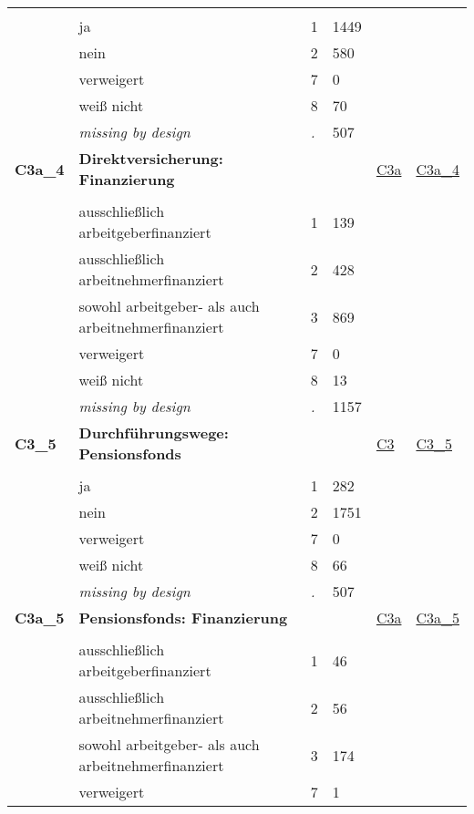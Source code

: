 \begin{longtable}{| L{2.45cm} | L{6cm} | C{1.5cm} | R{1cm} | C{2.25cm} | C{2.25cm} |}
   &  &  &  &  &  \\ 
   & ja & 1 & 1449 &  &  \\ 
   & nein & 2 & 580 &  &  \\ 
   & verweigert & 7 & 0 &  &  \\ 
   & weiß nicht & 8 & 70 &  &  \\ 
   & \textit{missing by design} & \textit{.} & 507 &  &  \\ 
   \midrule
\textbf{C3a\_4}\label{var:C3a:4} & \textbf{Direktversicherung: Finanzierung} &  &  & \hyperref[C3a]{C3a} & \hyperref[var:suf:C3a:4]{C3a\_4} \\ 
   &  &  &  &  &  \\ 
   & ausschließlich arbeitgeberfinanziert & 1 & 139 &  &  \\ 
   & ausschließlich arbeitnehmerfinanziert & 2 & 428 &  &  \\ 
   & sowohl arbeitgeber- als auch arbeitnehmerfinanziert & 3 & 869 &  &  \\ 
   & verweigert & 7 & 0 &  &  \\ 
   & weiß nicht & 8 & 13 &  &  \\ 
   & \textit{missing by design} & \textit{.} & 1157 &  &  \\ 
   \midrule
\textbf{C3\_5}\label{var:C3:5} & \textbf{Durchführungswege: Pensionsfonds} &  &  & \hyperref[C3]{C3} & \hyperref[var:suf:C3:5]{C3\_5} \\ 
   &  &  &  &  &  \\ 
   & ja & 1 & 282 &  &  \\ 
   & nein & 2 & 1751 &  &  \\ 
   & verweigert & 7 & 0 &  &  \\ 
   & weiß nicht & 8 & 66 &  &  \\ 
   & \textit{missing by design} & \textit{.} & 507 &  &  \\ 
   \midrule
\textbf{C3a\_5}\label{var:C3a:5} & \textbf{Pensionsfonds: Finanzierung} &  &  & \hyperref[C3a]{C3a} & \hyperref[var:suf:C3a:5]{C3a\_5} \\ 
   &  &  &  &  &  \\ 
   & ausschließlich arbeitgeberfinanziert & 1 & 46 &  &  \\ 
   & ausschließlich arbeitnehmerfinanziert & 2 & 56 &  &  \\ 
   & sowohl arbeitgeber- als auch arbeitnehmerfinanziert & 3 & 174 &  &  \\ 
   & verweigert & 7 & 1 &  &  \\ 

\end{longtable}
